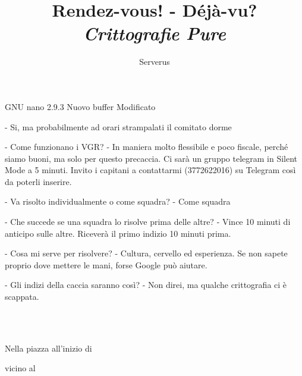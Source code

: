 \documentclass[12pt,a4paper]{article}
\date{}
\title{
  Rendez-vous! - Déjà-vu? \\
  \large \textit{Crittografie Pure}}
\author{Serverus}
\begin{document}
\maketitle
\thispagestyle{empty}
  GNU nano 2.9.3                                                                                                                   Nuovo buffer                                                                                                                   Modificato  

  - Si, ma probabilmente ad orari strampalati il comitato dorme

  - Come funzionano i VGR?
  - In maniera molto flessibile e poco fiscale, perché siamo buoni, ma solo per questo precaccia.
    Ci sarà un gruppo telegram in Silent Mode a 5 minuti. Invito i capitani a contattarmi (3772622016) su Telegram così da poterli inserire.

  - Va risolto individualmente o come squadra?
  - Come squadra

  - Che succede se una squadra lo risolve prima delle altre?
  - Vince 10 minuti di anticipo sulle altre. Riceverà il primo indizio 10 minuti prima.

  - Cosa mi serve per risolvere?
  - Cultura, cervello ed esperienza. Se non sapete proprio dove mettere le mani, forse Google può aiutare.

  - Gli indizi della caccia saranno così?
  - Non direi, ma qualche crittografia ci è scappata.

\newpage
\ \\
\ \\
\begin{center}
\begin{large}
Nella piazza all'inizio di

\end{large}
\end{center}
\noindent{}

\begin{center}
\begin{large}
vicino al

\end{large}\end{center}
 
\end{document}

